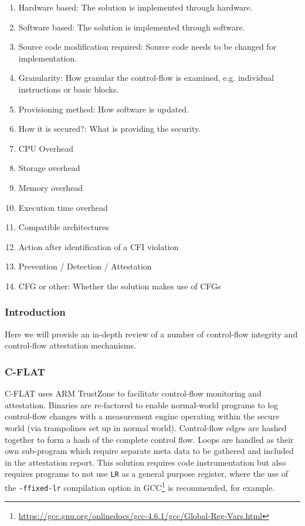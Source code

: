 \begin{enumerate}[ {(}1{)} ]
	\item Hardware based: The solution is implemented through hardware.
	\item Software based: The solution is implemented through software.
	\item Source code modification required: Source code needs to be changed for implementation.
	\item Granularity: How granular the control-flow is examined, e.g. individual instructions or basic blocks.
	\item Provisioning method: How software is updated.
	\item How it is secured?: What is providing the security.
	\item CPU Overhead
	\item Storage overhead
	\item Memory overhead
	\item Execution time overhead
	\item Compatible architectures
	\item Action after identification of a CFI violation
	\item Prevention / Detection / Attestation
	\item CFG or other: Whether the solution makes use of CFGs
\end{enumerate}

\subsubsection{Introduction}

Here we will provide an in-depth review of a number of control-flow integrity and control-flow attestation mechanisms.

\subsubsection{C-FLAT}
C-FLAT \cite{Abera2016} uses ARM TrustZone to facilitate control-flow monitoring and attestation. Binaries are re-factored to enable normal-world programs to log control-flow changes with a measurement engine operating within the secure world (via trampolines set up in normal world). Control-flow edges are hashed together to form a hash of the complete control flow. Loops are handled as their own sub-program which require separate meta data to be gathered and included in the attestation report. This solution requires code instrumentation but also requires programs to not use \verb|LR| as a general purpose register, where the use of the \verb|-ffixed-lr| compilation option in GCC\footnote{\url{https://gcc.gnu.org/onlinedocs/gcc-4.6.1/gcc/Global-Reg-Vars.html}} is recommended, for example.

